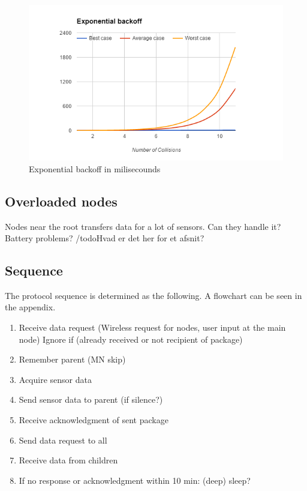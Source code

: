 \begin{figure}[H]\label{fig:expbackoff}
\centering
\includegraphics{figures/backoff.PNG}
\caption{Exponential backoff in milisecounds}
\label{fig:expbackoff}
\end{figure}

\subsection{Overloaded nodes}
Nodes near the root transfers data for a lot of sensors. Can they handle it? Battery problems? /todo{Hvad er det her for et afsnit?}

\subsection{Sequence}
The protocol sequence is determined as the following. A flowchart can be seen in the appendix.
\begin{enumerate}
	\item Receive data request (Wireless request for nodes, user input at the main node)
		\subitem Ignore if (already received or not recipient of package)
	\item Remember parent (MN skip)
	\item Acquire sensor data
	\item Send sensor data to parent (if silence?)
	\item Receive acknowledgment of sent package
	\item Send data request to all
	\item Receive data from children
	\item If no response or acknowledgment within 10 min: (deep) sleep?
\end{enumerate}

